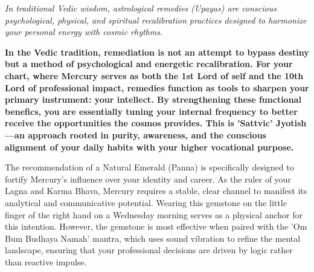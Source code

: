 


{\fontsize{9.5}{14}\selectfont\color{DeepSlate}\itshape In traditional Vedic wisdom, astrological remedies (Upayas) are conscious psychological, physical, and spiritual recalibration practices designed to harmonize your personal energy with cosmic rhythms.}\par\vspace{3.5mm}

\label{topic58}

{\fontsize{9.5}{13.8}\selectfont\bfseries\color{DeepSlate} In the Vedic tradition, remediation is not an attempt to bypass destiny but a method of psychological and energetic recalibration. For your chart, where Mercury serves as both the 1st Lord of self and the 10th Lord of professional impact, remedies function as tools to sharpen your primary instrument: your intellect. By strengthening these functional benefics, you are essentially tuning your internal frequency to better receive the opportunities the cosmos provides. This is 'Sattvic' Jyotish---an approach rooted in purity, awareness, and the conscious alignment of your daily habits with your higher vocational purpose.}\par\vspace{2mm}

{\fontsize{9}{13}\selectfont The recommendation of a Natural Emerald (Panna) is specifically designed to fortify Mercury's influence over your identity and career. As the ruler of your Lagna and Karma Bhava, Mercury requires a stable, clear channel to manifest its analytical and communicative potential. Wearing this gemstone on the little finger of the right hand on a Wednesday morning serves as a physical anchor for this intention. However, the gemstone is most effective when paired with the 'Om Bum Budhaya Namah' mantra, which uses sound vibration to refine the mental landscape, ensuring that your professional decisions are driven by logic rather than reactive impulse.}\par\vspace{1.8mm}

